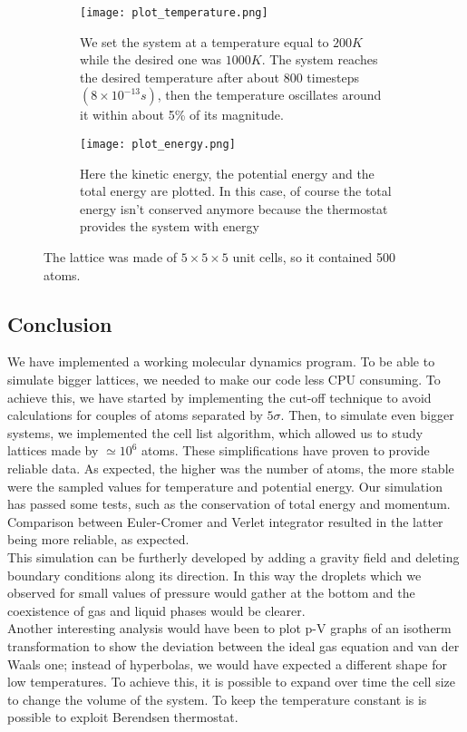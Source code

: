 \documentclass[10pt,a4paper,titlepage]{article}
\begin{document}
\begin{center}
\begin{figure}[H]
 \centering
\begin{subfigure}{.5\textwidth}
  \centering
  \texttt{[image: plot\_temperature.png]}
  \caption{We set the system at a temperature equal to $200K$
while the desired one was $1000K$. The system reaches
the desired temperature after about 800 timesteps
$(8 \times 10^{−13}s)$, then the temperature oscillates around it
within about 5\% of its magnitude.}
  \label{fig:sfig2}
\end{subfigure}%
\begin{subfigure}{.5\textwidth}
  \centering
  \texttt{[image: plot\_energy.png]}
  \caption{\footnotesize Here the kinetic energy, the potential energy and the total energy
are plotted. In this case, of course the total energy isn’t conserved
anymore because the thermostat provides the system with energy}
  \label{fig:sfig2}
\end{subfigure}%

\caption{{\footnotesize The lattice was made of $5\times 5\times 5$ unit cells, so it contained 500 atoms.}}
\label{fig:fig}
\end{figure}
\end{center}

\subsection*{Conclusion} 
\noindent We have implemented a working molecular dynamics program. To be able to simulate bigger lattices, we needed to make our code less CPU consuming. To achieve this, we have started by implementing the cut-off technique to avoid calculations for couples of atoms separated by $5 \sigma$. Then, to simulate even bigger systems, we implemented the cell list algorithm, which allowed us to study lattices made by $\simeq 10^6$ atoms. These simplifications have proven to provide reliable data. As expected, the higher was the number of atoms, the more stable were the sampled values for temperature and potential energy. Our simulation has passed some tests, such as the conservation of total energy and momentum. Comparison between Euler-Cromer and Verlet integrator resulted in the latter being more reliable, as expected.
\\This simulation can be furtherly developed by adding a gravity field and deleting boundary conditions along its direction. In this way the droplets which we observed for small values of pressure would gather at the bottom and the coexistence of gas and liquid phases would be clearer. 
\\Another interesting analysis would have been to plot p-V graphs of an isotherm transformation to show the deviation between the ideal gas equation and van der Waals one; instead of hyperbolas, we would have expected a different shape for low temperatures. To achieve this, it is possible to expand over time the cell size to change the volume of the system. To keep the temperature constant is is possible to exploit Berendsen thermostat.
\end{document}

